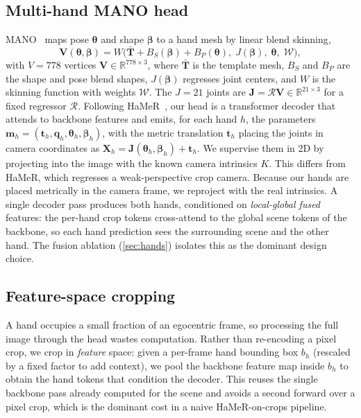 \documentclass[10pt,twocolumn,letterpaper]{article}
\begin{document}
\subsection{Multi-hand MANO head}
\label{sec:handhead}
MANO~\cite{romero2017mano} maps pose $\boldsymbol{\theta}$ and shape
$\boldsymbol{\beta}$ to a hand mesh by linear blend skinning,
\begin{equation}
  \mathbf{V}(\boldsymbol{\theta},\boldsymbol{\beta}) =
  W\!\big(\bar{\mathbf{T}} + B_S(\boldsymbol{\beta}) + B_P(\boldsymbol{\theta}),\;
  J(\boldsymbol{\beta}),\; \boldsymbol{\theta},\; \mathcal{W}\big),
  \label{eq:mano}
\end{equation}
with $V{=}778$ vertices $\mathbf{V}\in\mathbb{R}^{778\times3}$, where
$\bar{\mathbf{T}}$ is the template mesh, $B_S$ and $B_P$ are the shape and pose
blend shapes, $J(\boldsymbol{\beta})$ regresses joint centers, and $W$ is the
skinning function with weights $\mathcal{W}$. The $J{=}21$ joints are
$\mathbf{J}=\mathcal{R}\mathbf{V}\in\mathbb{R}^{21\times3}$ for a fixed regressor
$\mathcal{R}$. Following HaMeR~\cite{pavlakos2024hamer}, our head is a transformer
decoder that attends to backbone features and emits, for each hand $h$, the
parameters $\mathbf{m}_h=(\mathbf{t}_h,\mathbf{q}_h,\boldsymbol{\theta}_h,
\boldsymbol{\beta}_h)$, with the metric translation $\mathbf{t}_h$ placing the
joints in camera coordinates as $\mathbf{X}_h =
\mathbf{J}(\boldsymbol{\theta}_h,\boldsymbol{\beta}_h) + \mathbf{t}_h$. We
supervise them in 2D by projecting into the image with the known camera
intrinsics $K$. This differs from HaMeR, which regresses a weak-perspective crop
camera. Because our hands are placed metrically in the camera frame, we reproject
with the real intrinsics. A single decoder pass produces both hands, conditioned on
\emph{local-global fused} features: the per-hand crop tokens cross-attend to the
global scene tokens of the backbone, so each hand prediction sees the surrounding
scene and the other hand. The fusion ablation (\cref{sec:hands}) isolates this as
the dominant design choice.

\subsection{Feature-space cropping}
\label{sec:fcrop}
A hand occupies a small fraction of an egocentric frame, so processing the full
image through the head wastes computation. Rather than re-encoding a pixel crop,
we crop in \emph{feature} space: given a per-frame hand bounding box $b_h$
(rescaled by a fixed factor to add context), we pool the backbone feature map
inside $b_h$ to obtain the hand tokens that condition the decoder. This reuses
the single backbone pass already computed for the scene and avoids a second
forward over a pixel crop, which is the dominant cost in a naive HaMeR-on-crops
pipeline.
\end{document}
